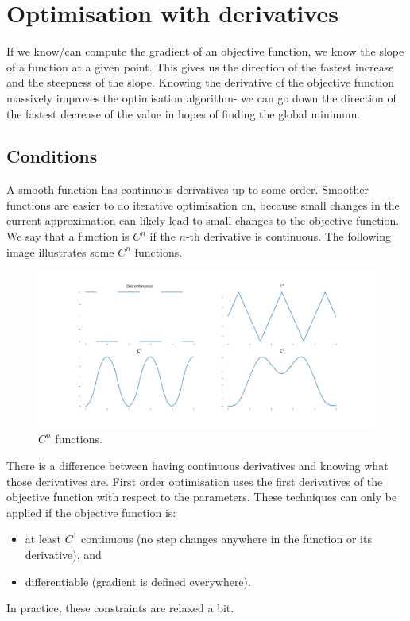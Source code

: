 \documentclass[a4paper, openany]{memoir}
\begin{document}
\section{Optimisation with derivatives}
If we know/can compute the gradient of an objective function, we know the slope of a function at a given point. This gives us the direction of the fastest increase and the steepness of the slope. Knowing the derivative of the objective function massively improves the optimisation algorithm- we can go down the direction of the fastest decrease of the value in hopes of finding the global minimum.

\subsection{Conditions}
A smooth function has continuous derivatives up to some order. Smoother functions are easier to do iterative optimisation on, because small changes in the current approximation can likely lead to small changes to the objective function. We say that a function is $C^n$ if the $n$-th derivative is continuous. The following image illustrates some $C^n$ functions.
\begin{figure}[H]
    \centering
    \includegraphics[scale=0.298]{src/4.24 Cn functions.png}
    \caption{$C^n$ functions.}
\end{figure}

There is a difference between having continuous derivatives and knowing what those derivatives are. First order optimisation uses the first derivatives of the objective function with respect to the parameters. These techniques can only be applied if the objective function is:
\begin{itemize}
    \item at least $C^1$ continuous (no step changes anywhere in the function or its derivative), and
    \item differentiable (gradient is defined everywhere).
\end{itemize}
In practice, these constraints are relaxed a bit.
\end{document}

